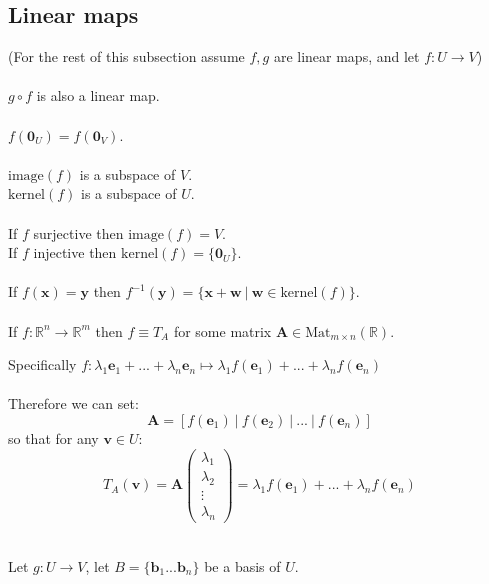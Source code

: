 \documentclass{scrartcl}
\newcommand{\R}{\mathbb{R}}
\renewcommand{\vec}[1]{\mathbf{#1}}
\begin{document}
\subsection{Linear maps}
(For the rest of this subsection assume $ f, g $ are linear maps, and let $ f : U \to V $)
\\\\
$ g \circ f $ is also a linear map.
\\\\
$ f(\vec{0}_{U}) = f(\vec{0}_{V}) $.
\\\\
$ \textrm{image}(f) $ is a subspace of $ V $.
\\
$ \textrm{kernel}(f) $ is a subspace of $ U $.
\\\\
If $ f $ surjective then $ \textrm{image}(f) = V $.
\\
If $ f $ injective then $ \textrm{kernel}(f) = \{\vec{0}_{U}\} $.
\\\\
If $ f(\vec{x}) = \vec{y} $ then $ f^{-1}(\vec{y}) = \{\vec{x} + \vec{w} \ | \ \vec{w} \in \textrm{kernel}(f) \} $.
\\\\
If $ f : \R^{n} \to \R^{m} $ then $ f \equiv T_{A} $ for some matrix $ \vec{A}  \in \textrm{Mat}_{m \times n}(\R) $.
\\
\begin{tcolorbox}[breakable]
Specifically $ f : \lambda_{1}\vec{e}_{1} + ... + \lambda_{n}\vec{e}_{n} \mapsto \lambda_{1}f(\vec{e}_{1}) + ... + \lambda_{n}f(\vec{e}_{n}) $
\\\\
Therefore we can set:
\begin{equation}
\vec{A} = [f(\vec{e}_{1}) \ | \ f(\vec{e}_{2}) \ | \ ... \ |\  f(\vec{e}_{n})]
\end{equation}
so that for any $ \vec{v} \in U $:
\begin{equation}
T_{A}(\vec{v}) = \vec{A}
\begin{pmatrix}
\lambda_{1} \\ \lambda_{2} \\ \vdots \\ \lambda_{n}
\end{pmatrix}
= \lambda_{1}f(\vec{e}_{1}) + ... + \lambda_{n}f(\vec{e}_{n})
\end{equation}
\end{tcolorbox}
\noindent
\\
Let $ g : U \to V $, let $ B = \{\vec{b}_{1}...\vec{b}_{n}\} $ be a basis of $ U $.
\end{document}
